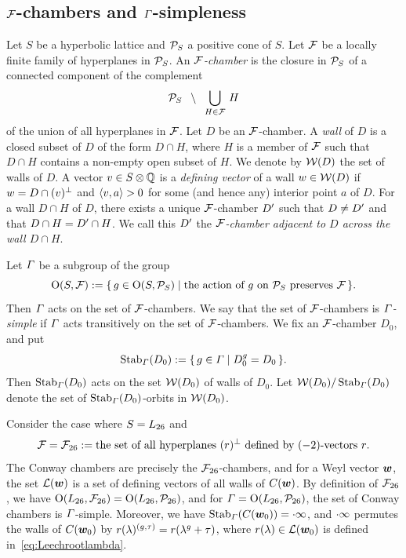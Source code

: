 \documentclass{amsart} %
\begin{document}
\subsection{$\mathord{\mathcal{F}}$-chambers and $\varGamma$-simpleness}\label{subsec:FFF}
%
%
Let $S$ be a hyperbolic lattice
and $\mathord{\mathcal{P}}_S$ a positive cone of $S$.
Let $\mathord{\mathcal{F}}$ be a locally finite family of hyperplanes in $\mathord{\mathcal{P}}_S$.
An \emph{$\mathord{\mathcal{F}}$-chamber} is the closure in $\mathord{\mathcal{P}}_S$ of a connected component 
of the complement
\[
\mathord{\mathcal{P}}_S\;\;\setminus \;\; \bigcup_{H\in \mathord{\mathcal{F}}}\, H
\]
of the union of all hyperplanes in $\mathord{\mathcal{F}}$.
Let $D$ be an $\mathord{\mathcal{F}}$-chamber.
A \emph{wall} of $D$ is a closed subset of $D$
of the form $D\cap H$, where $H$ is a member of $\mathord{\mathcal{F}}$
such that $D\cap H$ contains a non-empty open subset of $H$.
We denote by $\mathord{\mathcal{W}}(D)$ the set of walls of $D$.
A vector $v\in S\otimes\mathord{\mathbb{Q}}$ is a \emph{defining vector} of a wall $w\in \mathord{\mathcal{W}}(D)$ 
if $w=D\cap (v)^{\perp}$ and $\langle v, a \rangle>0$ for some (and hence any) interior point $a$ of $D$.
For a wall $D\cap H$ of $D$,
there exists a unique $\mathord{\mathcal{F}}$-chamber $D^{\prime}$
such that $D\ne D^{\prime}$ and that $D\cap H=D^{\prime}\cap H$.
We call this $D^{\prime}$ the \emph{$\mathord{\mathcal{F}}$-chamber adjacent to $D$ across the wall $D\cap H$}.
\par
%
Let $\varGamma$ be a subgroup
of the group 
\[
\mathord{\mathrm{O}}(S, \mathord{\mathcal{F}}):=\{\,{g\in \mathord{\mathrm{O}}(S, \mathord{\mathcal{P}}_S)}\mid {\textrm{the action of $g$ on $\mathord{\mathcal{P}}_S$ preserves $\mathord{\mathcal{F}}$}} \,\}.
\]
%
%
Then $\varGamma$ acts on the set of $\mathord{\mathcal{F}}$-chambers.
We say that the set of $\mathord{\mathcal{F}}$-chambers is \emph{$\varGamma$-simple}
if $\varGamma$ acts transitively on the set of $\mathord{\mathcal{F}}$-chambers.
We fix an $\mathord{\mathcal{F}}$-chamber $D_0$, and put
\[
\operatorname{Stab}_{\varGamma}(D_0):=\{\,{g\in \varGamma}\mid {D_0^g=D_0} \,\}.
\]
Then $\operatorname{Stab}_{\varGamma}(D_0)$ acts on the set $\mathord{\mathcal{W}}(D_0)$ of walls of $D_0$.
Let $\mathord{\mathcal{W}}(D_0)/\operatorname{Stab}_{\varGamma}(D_0)$ denote the set of 
$\operatorname{Stab}_{\varGamma}(D_0)$-orbits in $\mathord{\mathcal{W}}(D_0)$.
%
\begin{example}
Consider the case where $S=L_{26}$ and 
\[
\mathord{\mathcal{F}}={\mathord{\mathcal{F}}}_{26}:=\textrm{the set of all hyperplanes $(r)^{\perp}$ defined by $(-2)$-vectors $r$}.
\]
The Conway chambers are precisely the ${\mathord{\mathcal{F}}}_{26}$-chambers,
and for a Weyl vector $\boldsymbol{w}$,
the set $\mathord{\mathcal{L}}(\boldsymbol{w})$ %
is 
a set of 
defining vectors of all walls of $\mathord{C}(\boldsymbol{w})$.
By  definition of ${\mathord{\mathcal{F}}}_{26}$, 
we have $\mathord{\mathrm{O}}(L_{26}, {\mathord{\mathcal{F}}}_{26})=\mathord{\mathrm{O}}(L_{26}, \mathord{\mathcal{P}}_{26})$,
and for $\varGamma=\mathord{\mathrm{O}}(L_{26}, \mathord{\mathcal{P}}_{26})$,
the set of Conway chambers  is $\varGamma$-simple.
Moreover, we have $\operatorname{Stab}_{\varGamma}(\mathord{C}(\boldsymbol{w}_0))=\cdot \infty$,
and $\cdot \infty$ 
 permutes 
the walls of $\mathord{C}(\boldsymbol{w}_0)$ by 
$r(\lambda)^{(g, \tau)}=r(\lambda^g+\tau)$,
where $r(\lambda)\in \mathord{\mathcal{L}}(\boldsymbol{w}_0)$ is 
defined in~\eqref{eq:Leechrootlambda}.
\end{example}
\end{document}
